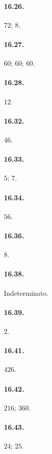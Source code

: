 \begin{multicols}{2}
\paragraph{16.26.}
$72$; $8$.

\paragraph{16.27.}
$60$; $60$; $60$.

\paragraph{16.28.}
$12$.

\paragraph{16.32.}
$46$.

\paragraph{16.33.}
$5$; $7$.

\paragraph{16.34.}
$56$.

\paragraph{16.36.}
$8$.

\paragraph{16.38.}
Indeterminato.

\paragraph{16.39.}
$2$.

\paragraph{16.41.}
$426$.

\paragraph{16.42.}
$216$; $360$.

\paragraph{16.43.}
$24$; $25$.


\end{multicols}
